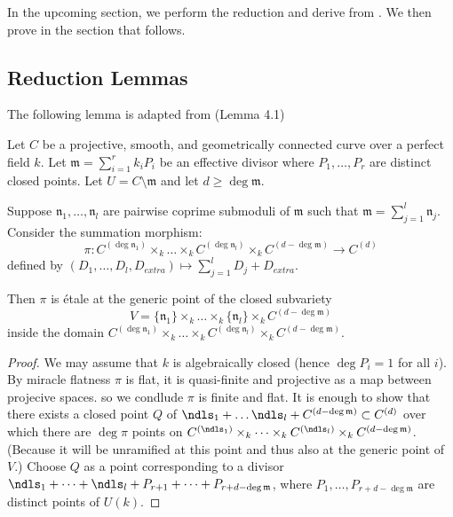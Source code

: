 In the upcoming section, we perform the reduction and derive  from 
. 
We then prove  in the section that follows.

\subsection{Reduction Lemmas}

The following lemma is adapted from \cite{takeuchi2019blow} (Lemma 4.1)
\begin{lemma}\label{lemma:takeuchi_lemma}
     Let $C$ be a projective, smooth, and geometrically connected curve over a perfect field $k$. 
     Let $\mathfrak{m} = \sum_{i=1}^{r} k_i P_i$ be an effective divisor where $P_1, \dots, P_r$ are distinct closed points. 
     Let $U = C \setminus \mathfrak{m}$ and let $d \geq \deg \mathfrak{m}$.

     Suppose $\mathfrak{n}_1, \dots, \mathfrak{n}_l$ are pairwise coprime submoduli of $\mathfrak{m}$ such that $\mathfrak{m} = \sum_{j=1}^l \mathfrak{n}_j$. 
     Consider the summation morphism:
     \[
     \pi : C^{(\deg \mathfrak{n}_1)} \times_k \dots \times_k C^{(\deg \mathfrak{n}_l)} \times_k C^{(d - \deg \mathfrak{m})} \longrightarrow C^{(d)}
     \]
     defined by $(D_1, \dots, D_l, D_{extra}) \mapsto \sum_{j=1}^l D_j + D_{extra}$.

     Then $\pi$ is étale at the generic point of the closed subvariety 
     \[
     V = \{\mathfrak{n}_1\} \times_k \dots \times_k \{\mathfrak{n}_l\} \times_k C^{(d - \deg \mathfrak{m})}
     \]
     inside the domain $C^{(\deg \mathfrak{n}_1)} \times_k \dots \times_k C^{(\deg \mathfrak{n}_l)} \times_k C^{(d - \deg \mathfrak{m})}$.

\begin{proof}
     We may assume that $k$ is algebraically closed (hence $\deg P_i = 1$ for all $i$). By miracle flatness $\pi$ is flat, it is quasi-finite and projective as a map between projecive spaces.
     so we condlude $\pi$ is finite and flat. 
     It is enough to show that there exists a closed point $Q$ of $\ndls_1 + \dots \ndls_l + C^{(d - \deg \mathfrak{m})} \subset C^{(d)}$ 
     over which there are $\deg \pi$ points on $C^{(\ndls_1)} \times_k \dots \times_k C^{(\ndls_l)} \times_k C^{(d - \deg \mathfrak{m})}$. (Because it will be unramified 
     at this point and thus also at the generic point of $V$.)
     Choose $Q$ as a point corresponding to a divisor
     $\ndls_1 + \dots + \ndls_l + P_{r+1} + \dots + P_{r+d - \deg \mathfrak{m}}$, where $P_1, \dots, P_{r+d - \deg \mathfrak{m}}$ are distinct points of $U(k)$.
\end{proof}     
\end{lemma}


